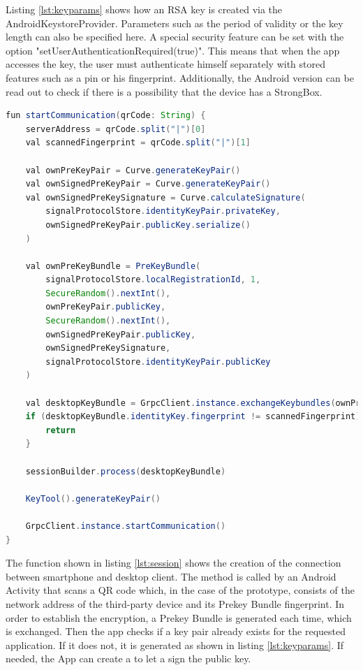 \documentclass[12pt,oneside,a4paper,parskip]{scrbook}
\begin{document}
Listing \ref{lst:keyparams} shows how an RSA key is created via the AndroidKeystoreProvider. Parameters such as the period of validity or the key length can also be specified here. A special security feature can be set with the option "setUserAuthenticationRequired(true)". This means that when the app accesses the key, the user must authenticate himself separately with stored features such as a pin or his fingerprint. Additionally, the Android version can be read out to check if there is a possibility that the device has a StrongBox.

\begin{lstlisting}[label=lst:session,
				   language=java,
				   firstnumber=1,
				   caption=Creating a Session]
fun startCommunication(qrCode: String) {
    serverAddress = qrCode.split("|")[0]
    val scannedFingerprint = qrCode.split("|")[1]

    val ownPreKeyPair = Curve.generateKeyPair()
    val ownSignedPreKeyPair = Curve.generateKeyPair()
    val ownSignedPreKeySignature = Curve.calculateSignature(
        signalProtocolStore.identityKeyPair.privateKey,
        ownSignedPreKeyPair.publicKey.serialize()
    )

    val ownPreKeyBundle = PreKeyBundle(
        signalProtocolStore.localRegistrationId, 1,
        SecureRandom().nextInt(),
        ownPreKeyPair.publicKey,
        SecureRandom().nextInt(),
        ownSignedPreKeyPair.publicKey,
        ownSignedPreKeySignature,
        signalProtocolStore.identityKeyPair.publicKey
    )

    val desktopKeyBundle = GrpcClient.instance.exchangeKeybundles(ownPreKeyBundle)
    if (desktopKeyBundle.identityKey.fingerprint != scannedFingerprint) {
        return
    }

    sessionBuilder.process(desktopKeyBundle)

    KeyTool().generateKeyPair()

    GrpcClient.instance.startCommunication()
}
\end{lstlisting}

The function shown in listing \ref{lst:session} shows the creation of the connection between smartphone and desktop client. The method is called by an Android Activity that scans a QR code which, in the case of the prototype, consists of the network address of the third-party device and its Prekey Bundle fingerprint. In order to establish the encryption, a Prekey Bundle is generated each time, which is exchanged. Then the app checks if a key pair already exists for the requested application. If it does not, it is generated as shown in listing \ref{lst:keyparams}. If needed, the App can create a  to let a  sign the public key.
\end{document}

